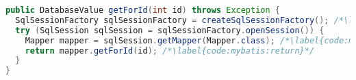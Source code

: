 
\begin{lstlisting}[language=Java, caption={Using MyBatis to load data from database}, label={code:mybatis}]
public DatabaseValue getForId(int id) throws Exception {
  SqlSessionFactory sqlSessionFactory = createSqlSessionFactory(); /*\label{code:mybatis:sqlSessionFactory}*/
  try (SqlSession sqlSession = sqlSessionFactory.openSession()) {
    Mapper mapper = sqlSession.getMapper(Mapper.class); /*\label{code:mybatis:getMapper}*/
    return mapper.getForId(id); /*\label{code:mybatis:return}*/
  }
}
\end{lstlisting}
